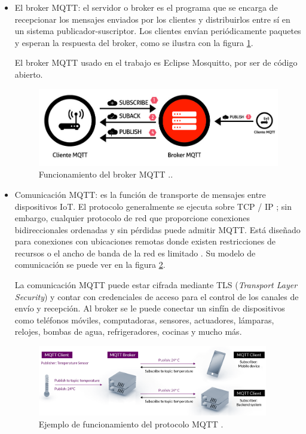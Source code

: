 \begin{itemize}
\item El broker MQTT: el servidor o broker es el programa que se encarga de recepcionar los mensajes enviados por los clientes y distribuirlos entre sí en un sistema publicador-suscriptor. Los clientes envían periódicamente paquetes y esperan la respuesta del broker, como se ilustra con la figura \ref{fig:broker}. 

El broker MQTT usado en el trabajo es Eclipse Mosquitto, por ser de código abierto.

\begin{figure}[htbp]
	\centering
	\includegraphics[width=.75\textwidth]{./Figures/broker.jpg}
	\caption{Funcionamiento del broker MQTT \protect\footnotemark..}
	\label{fig:broker}
\end{figure}

\item Comunicación MQTT: es la función de transporte de mensajes entre dispositivos IoT. El protocolo generalmente se ejecuta sobre TCP / IP ; sin embargo, cualquier protocolo de red que proporcione conexiones bidireccionales ordenadas y sin pérdidas puede admitir MQTT. Está diseñado para conexiones con ubicaciones remotas donde existen restricciones de recursos o el ancho de banda de la red es limitado \citep{WEBSITE:3}. Su modelo de comunicación se puede ver en la figura \ref{fig:mqtt}.




La comunicación MQTT puede estar cifrada mediante TLS (\emph{Transport Layer Security}) y contar con credenciales de acceso para el control de los canales de envío y recepción. Al broker se le puede conectar un sinfín de dispositivos como teléfonos móviles, computadoras, sensores, actuadores, lámparas, relojes, bombas de agua, refrigeradores, cocinas y mucho más. 

\begin{figure}[htbp]
	\centering
	\includegraphics[width=0.95\textwidth]{./Figures/mqtt.png}
	\caption{Ejemplo de funcionamiento del protocolo MQTT \protect\footnotemark.}
	\label{fig:mqtt}
\end{figure}


\end{itemize}
